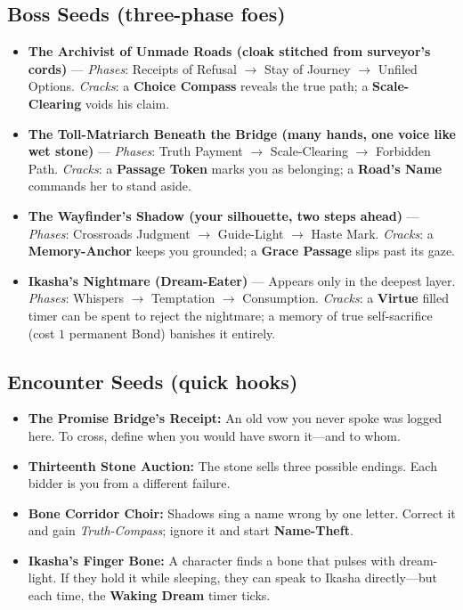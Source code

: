 \subsection*{Boss Seeds (three-phase foes)}
\begin{itemize}
\item \textbf{The Archivist of Unmade Roads (cloak stitched from surveyor's cords)} --- \emph{Phases}: Receipts of Refusal $\rightarrow$ Stay of Journey $\rightarrow$ Unfiled Options. \emph{Cracks}: a \textbf{Choice Compass} reveals the true path; a \textbf{Scale-Clearing} voids his claim.
\item \textbf{The Toll-Matriarch Beneath the Bridge (many hands, one voice like wet stone)} --- \emph{Phases}: Truth Payment $\rightarrow$ Scale-Clearing $\rightarrow$ Forbidden Path. \emph{Cracks}: a \textbf{Passage Token} marks you as belonging; a \textbf{Road's Name} commands her to stand aside.
\item \textbf{The Wayfinder's Shadow (your silhouette, two steps ahead)} --- \emph{Phases}: Crossroads Judgment $\rightarrow$ Guide-Light $\rightarrow$ Haste Mark. \emph{Cracks}: a \textbf{Memory-Anchor} keeps you grounded; a \textbf{Grace Passage} slips past its gaze.
\item \textbf{Ikasha's Nightmare (Dream-Eater)} --- Appears only in the deepest layer. \emph{Phases}: Whispers $\rightarrow$ Temptation $\rightarrow$ Consumption. \emph{Cracks}: a \textbf{Virtue} filled timer can be spent to reject the nightmare; a memory of true self-sacrifice (cost $1$ permanent Bond) banishes it entirely.
\end{itemize}

\subsection*{Encounter Seeds (quick hooks)}
\begin{itemize}
\item \textbf{The Promise Bridge's Receipt:} An old vow you never spoke was logged here. To cross, define when you would have sworn it---and to whom.
\item \textbf{Thirteenth Stone Auction:} The stone sells three possible endings. Each bidder is you from a different failure.
\item \textbf{Bone Corridor Choir:} Shadows sing a name wrong by one letter. Correct it and gain \emph{Truth-Compass}; ignore it and start \textbf{Name-Theft}.
\item \textbf{Ikasha's Finger Bone:} A character finds a bone that pulses with dream-light. If they hold it while sleeping, they can speak to Ikasha directly---but each time, the \textbf{Waking Dream} timer ticks.
\end{itemize}


